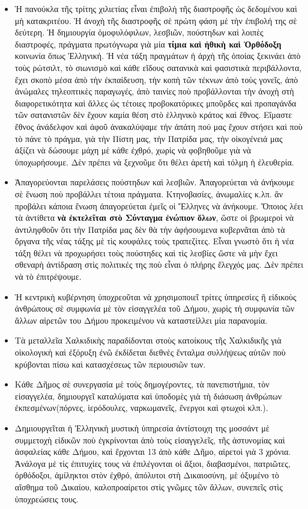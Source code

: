 \documentclass[a4paper]{article}
\begin{document}
\begin{itemize}
\item Ἡ πανούκλα τῆς τρίτης χιλιετίας εἶναι ἐπιβολὴ τῆς διαστροφῆς ὡς δεδομένου καὶ μὴ κατακριτέου. Ἡ ἀνοχὴ τῆς διαστροφῆς σὲ πρώτη φάση μὲ τὴν ἐπιβολή της σὲ δεύτερη. Ἡ δημιουργία ὁμοφυλόφιλων, λεσβιῶν, πούστηδων καὶ λοιπὲς διαστροφές, πράγματα πρωτόγνωρα γιὰ μία \textbf{τίμια καὶ ἠθικὴ καὶ Ὀρθόδοξη} κοινωνία ὅπως Ἑλληνική. Ἡ νέα τάξη πραγμάτων ἡ ἀρχὴ τῆς ὁποίας ξεκινάει ἀπὸ τοὺς ρώτσιλτ, τὸ σιωνισμὸ καὶ κάθε εἴδους σατανικὰ καὶ φασιστικὰ περιβάλλοντα, ἔχει σκοπὸ μέσα ἀπὸ τὴν ἐκπαίδευση, τὴν κοπὴ τῶν τέκνων ἀπὸ τοὺς γονεῖς, ἀπὸ ἀνώμαλες τηλεοπτικὲς παραγωγές, ἀπὸ ταινίες ποὺ προβάλλονται τὴν ἀνοχὴ στὴ διαφορετικότητα καὶ ἄλλες ὡς τέτοιες προβοκατόρικες μποῦρδες καὶ προπαγάνδα τῶν σατανιστῶν δὲν ἔχουν καμία θέση στὸ ἑλληνικὸ κράτος καὶ ἔθνος. Εἴμαστε ἔθνος ἀνάδελφον καὶ ἀφοῦ ἀνακαλύψαμε τὴν ἀπάτη πού μας ἔχουν στήσει καὶ ποὺ τὸ πάνε τὸ πράγμα, γιὰ τὴν Πίστη μας, τὴν Πατρίδα μας, τὴν οἰκογένειά μας ἀξίζει νὰ δώσουμε μάχη μὲ κάθε ἐχθρό, χωρὶς νὰ φοβηθοῦμε γιὰ νὰ ὑποχωρήσουμε. Δὲν πρέπει νὰ ξεχνοῦμε ὅτι θέλει ἀρετὴ καὶ τόλμη ἡ ἐλευθερία.
\item Ἀπαγορεύονται παρελάσεις πούστηδων καὶ λεσβιῶν. Ἀπαγορεύεται νὰ ἀνήκουμε σὲ ἕνωση ποὺ προβάλλει τέτοια πράγματα. Κτηνοβασίες, ἀνωμαλίες κ.λπ. ἂν προβάλει κάποια ἕνωση ἀπαγορεύεται ἐμεῖς οἱ Ἕλληνες νὰ ἀνήκουμε. Ὅποιος λέει τὰ ἀντίθετα \textbf{νὰ ἐκτελεῖται στὸ Σύνταγμα ἐνώπιον ὅλων}, ὥστε οἱ βρωμεροὶ νὰ ἀντιληφθοῦν ὅτι τὴν Πατρίδα μας δὲν θὰ τὴν ἀφήσουμενα κυβερνᾶται ἀπὸ τὰ ὄργανα τῆς νέας τάξης μὲ τὶς κουφάλες τοὺς τραπεζίτες. Εἶναι γνωστὸ ὅτι ἡ νέα τάξη θέλει νὰ προχωρήσει τοὺς πούστηδες καὶ τὶς λεσβίες ὥστε νὰ μὴν ἔχει σθεναρὴ ἀντίδραση στὶς πολιτικές της ποὺ εἶναι ὁ πλήρης ἔλεγχός μας. Δὲν πρέπει νὰ τὸ ἐπιτρέψουμε.
\item Ἡ κεντρικὴ κυβέρνηση ὑποχρεοῦται νὰ χρησιμοποιεῖ τρίτες ὑπηρεσίες ἢ εἰδικοὺς ἀνθρώπους σὲ συμφωνία μὲ τὸν εἰσαγγελέα τοῦ Δήμου, χωρὶς τὴ συμφωνία τῶν ἄλλων αἱρετῶν του Δήμου προκειμένου νὰ καταστείλλει μία παρανομία. 
\item Τὰ μεταλλεῖα Χαλκιδικὴς παραδίδονται στοὺς κατοίκους τῆς Χαλκιδικῆς γιὰ οἰκολογικὴ καὶ ἐξόρυξη ἐνῶ ἐκδίδεται διεθνὲς ἔνταλμα συλλήψεως αὐτῶν ποὺ κρύβονται πίσω καὶ κατασχέσεως τῶν περιουσιῶν των.
\item Κάθε Δῆμος σὲ συνεργασία μὲ τοὺς δημογέροντες, τὰ πανεπιστήμια, τὸν εἰσαγγελέα, δημιουργεῖ καταλύματα καὶ ὑποδομὲς γιὰ τὴ διάσωση ἀνθρώπων ἐκπεσμένων(πόρνες, ἱερόδουλες, ναρκωμανεῖς, ἔνεργοι καὶ φτωχοὶ κλπ.).
\item Δημιουργεῖται ἡ Ἑλληνικὴ μυστικὴ ὑπηρεσία ἀντίστοιχη της μοσσάντ μὲ συμμετοχὴ εἰδικῶν ποὺ ἐγκρίνονται ἀπὸ τοὺς εἰσαγγελεῖς, τῆς ἀστυνομίας καὶ ἀσφαλείας κάθε Δήμου, καὶ ἔρχονται 13 ἀπὸ κάθε Δῆμο, αἱρετοὶ γιὰ 3 χρόνια. Ἀνάλογα μὲ τὶς ἐπιτυχίες τους νὰ ἐπιλέγονται οἱ ἄξιοι, διαβασμένοι, πατριῶτες, ὀρθόδοξοι, ἀμίληκτοι στὸν ἐχθρό, ἀπόλυτοι στὴ Δικαιοσύνη, μὲ ὀξυμένο τὸ αἴσθημα τοῦ Δικαίου, καλοπροαίρετοι στὶς γνῶμες τῶν ἄλλων, συνεπεῖς στὶς ὑποχρεώσεις τους.

\end{itemize}
\end{document}
